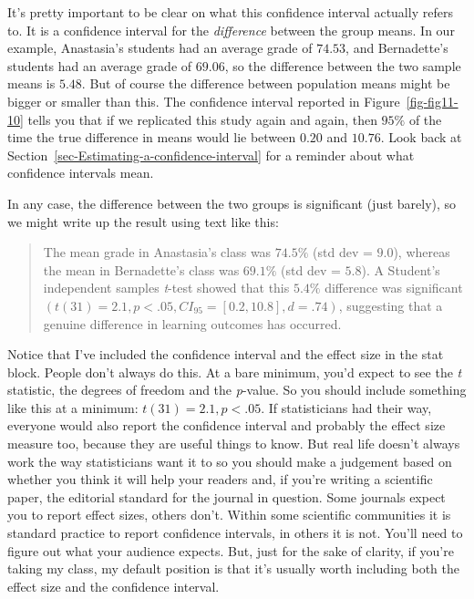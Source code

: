 \documentclass[
  a4paper,
]{book}
\begin{document}
It's pretty important to be clear on what this confidence interval
actually refers to. It is a confidence interval for the
\emph{difference} between the group means. In our example, Anastasia's
students had an average grade of \(74.53\), and Bernadette's students
had an average grade of \(69.06\), so the difference between the two
sample means is \(5.48\). But of course the difference between
population means might be bigger or smaller than this. The confidence
interval reported in Figure~\ref{fig-fig11-10} tells you that if we
replicated this study again and again, then \(95\%\) of the time the
true difference in means would lie between \(0.20\) and \(10.76\). Look
back at Section~\ref{sec-Estimating-a-confidence-interval} for a
reminder about what confidence intervals mean.

In any case, the difference between the two groups is significant (just
barely), so we might write up the result using text like this:

\begin{quote}
The mean grade in Anastasia's class was \(74.5\%\) (std dev = \(9.0\)),
whereas the mean in Bernadette's class was \(69.1\%\) (std dev =
\(5.8\)). A Student's independent samples \emph{t}-test showed that this
\(5.4\%\) difference was significant
\((t(31) = 2.1, p<.05, CI_{95} = [0.2, 10.8], d = .74)\), suggesting
that a genuine difference in learning outcomes has occurred.
\end{quote}

Notice that I've included the confidence interval and the effect size in
the stat block. People don't always do this. At a bare minimum, you'd
expect to see the \emph{t} statistic, the degrees of freedom and the
\emph{p}-value. So you should include something like this at a minimum:
\(t(31) = 2.1, p< .05\). If statisticians had their way, everyone would
also report the confidence interval and probably the effect size measure
too, because they are useful things to know. But real life doesn't
always work the way statisticians want it to so you should make a
judgement based on whether you think it will help your readers and, if
you're writing a scientific paper, the editorial standard for the
journal in question. Some journals expect you to report effect sizes,
others don't. Within some scientific communities it is standard practice
to report confidence intervals, in others it is not. You'll need to
figure out what your audience expects. But, just for the sake of
clarity, if you're taking my class, my default position is that it's
usually worth including both the effect size and the confidence
interval.
\end{document}

